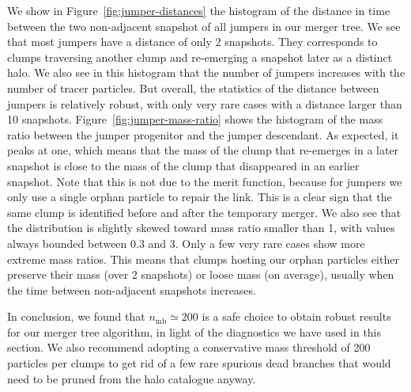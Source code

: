 We show in Figure~\ref{fig:jumper-distances} the histogram of the
distance in time between the two non-adjacent snapshot of all jumpers
in our merger tree. We see that most jumpers have a distance of only 2
snapshots. They corresponds to clumps traversing another clump and
re-emerging a snapshot later as a distinct halo. We also see in
this histogram that the number of jumpers increases with the number of
tracer particles. But overall, the statistics of the distance between
jumpers is relatively robust, with only very rare cases with a
distance larger than 10 snapshots. Figure~\ref{fig:jumper-mass-ratio}
shows the histogram of the mass ratio between the jumper progenitor
and the jumper descendant.  As expected, it peaks at one, which means
that the mass of the clump that re-emerges in a later snapshot is
close to the mass of the clump that disappeared in an earlier
snapshot. Note that this is not due to the merit function, because for
jumpers we only use a single orphan particle to repair the link. This
is a clear sign that the same clump is identified before and after the
temporary merger.  We also see that the distribution is slightly
skewed toward mass ratio smaller than 1, with values always bounded
between 0.3 and 3. Only a few very rare cases show more extreme mass
ratios. This means that clumps hosting our orphan particles either
preserve their mass (over 2 snapshots) or loose mass (on average),
usually when the time between non-adjacent snapshots increases.

In conclusion, we found that $n_{\mathrm{mb}} \simeq 200$ is a safe choice
to obtain robust results for our merger tree algorithm, in light of
the diagnostics we have used in this section.  We also recommend
adopting a conservative mass threshold of 200 particles per clumps to
get rid of a few rare spurious dead branches that would need to be
pruned from the halo catalogue anyway.
